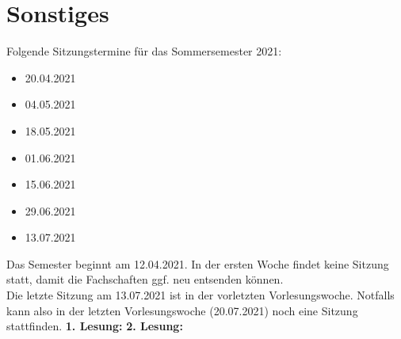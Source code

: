 \section{Sonstiges}
{
	Folgende Sitzungstermine für das Sommersemester 2021:
	\begin{itemize}
		\item 20.04.2021
		\item 04.05.2021
		\item 18.05.2021
		\item 01.06.2021
		\item 15.06.2021
		\item 29.06.2021
		\item 13.07.2021
	\end{itemize}
}{
	Das Semester beginnt am 12.04.2021. In der ersten Woche findet keine Sitzung statt, damit die Fachschaften ggf. neu entsenden können.\\
	Die letzte Sitzung am 13.07.2021 ist in der vorletzten Vorlesungswoche. Notfalls kann also in der letzten Vorlesungswoche (20.07.2021) noch eine Sitzung stattfinden.
}{
	\textbf{1. Lesung:}
    \ul{}
	\textbf{2. Lesung:}
    \ul{}
}{
}